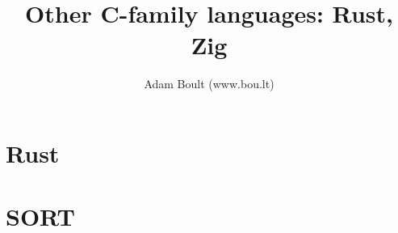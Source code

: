 \documentclass[oneside]{book}
\begin{document}
\author{Adam Boult (www.bou.lt)}
\title{Other C-family languages: Rust, Zig}
\maketitle

\setcounter{tocdepth}{0}
\tableofcontents



\part{Rust}







\part{SORT}

\end{document}
